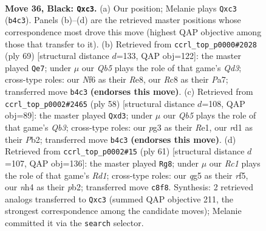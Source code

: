 \documentclass[11pt]{article}
\begin{document}
\clearpage

\begin{figure}[p]\centering
\begin{subfigure}{0.46\textwidth}\centering
\resizebox{\linewidth}{!}{%
\newchessgame
\chessboard[
  setfen={2r3k1/3n2p1/1p3n2/r2p2Qp/Pq2p2N/2N3P1/2P2P1P/R2R1K2 b - - 7 36},
  showmover=false,
  pgfstyle=straightmove, color=movearrow, markmove={b4-c3}
]}
\caption{}
\end{subfigure}\hfill
\begin{subfigure}{0.46\textwidth}\centering
\resizebox{\linewidth}{!}{%
\newchessgame
\chessboard[
  setfen={4r1k1/p2r2p1/1p1qNnQ1/3p1P2/P3p3/7P/1P3P2/3RR1K1 b - - 1 35},
  showmover=false,
  pgfstyle=straightmove, color=movearrow, markmove={d6-e7}
]}
\caption{}
\end{subfigure}
\\[4pt]
\begin{subfigure}{0.46\textwidth}\centering
\resizebox{\linewidth}{!}{%
\newchessgame
\chessboard[
  setfen={2r3k1/pp1qrpn1/6p1/3pP1Rn/P2P1P2/1Q1b1N2/1P2NK2/4R3 w - - 0 30},
  showmover=false,
  pgfstyle=straightmove, color=movearrow, markmove={b3-d3}
]}
\caption{}
\end{subfigure}\hfill
\begin{subfigure}{0.46\textwidth}\centering
\resizebox{\linewidth}{!}{%
\newchessgame
\chessboard[
  setfen={3r3k/1p3r1p/2n2p1q/pQ2nR1N/P7/2Pp4/1P4PP/3N1R1K b - - 5 31},
  showmover=false,
  pgfstyle=straightmove, color=movearrow, markmove={d8-g8}
]}
\caption{}
\end{subfigure}
\caption{\textbf{Move 36, Black: \texttt{Qxc3}.} (a) Our position; Melanie plays \texttt{Qxc3} (\texttt{b4c3}). Panels (b)--(d) are the retrieved master positions whose correspondence most drove this move (highest QAP objective among those that transfer to it). (b) Retrieved from \texttt{ccrl\_top\_p0000\#2028} (ply 69) [structural distance $d$=133, QAP obj=122]: the master played \texttt{Qe7}; under $\mu$ our \emph{Qb5} plays the role of that game's \emph{Qd3}; cross-type roles: our \emph{N}f6 as their \emph{R}e8, our \emph{R}c8 as their \emph{P}a7; transferred move \texttt{b4c3} \textbf{(endorses this move)}. (c) Retrieved from \texttt{ccrl\_top\_p0002\#2465} (ply 58) [structural distance $d$=108, QAP obj=89]: the master played \texttt{Qxd3}; under $\mu$ our \emph{Qb5} plays the role of that game's \emph{Qb3}; cross-type roles: our \emph{p}g3 as their \emph{R}e1, our \emph{r}d1 as their \emph{P}b2; transferred move \texttt{b4c3} \textbf{(endorses this move)}. (d) Retrieved from \texttt{ccrl\_top\_p0002\#15} (ply 61) [structural distance $d$=107, QAP obj=136]: the master played \texttt{Rg8}; under $\mu$ our \emph{Rc1} plays the role of that game's \emph{Rd1}; cross-type roles: our \emph{q}g5 as their \emph{r}f5, our \emph{n}h4 as their \emph{p}b2; transferred move \texttt{c8f8}. Synthesis: 2 retrieved analogs transferred to \texttt{Qxc3} (summed QAP objective 211, the strongest correspondence among the candidate moves); Melanie committed it via the \texttt{search} selector.}
\label{fig:thought-m71}
\end{figure}
\end{document}
